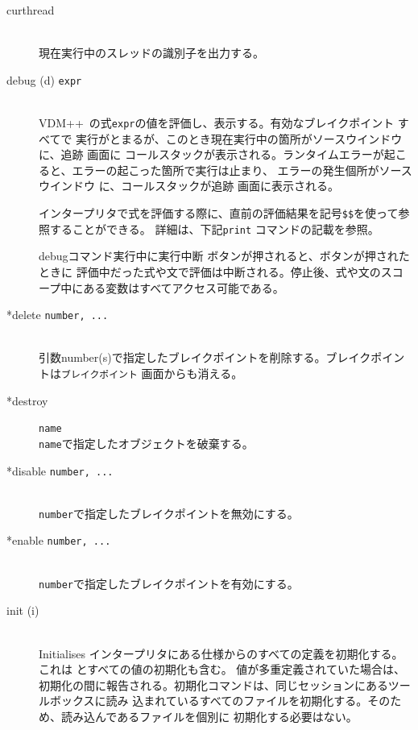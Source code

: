 \documentclass[\pformat,12pt]{jarticle}
\newcommand{\vdmslpp}{VDM++}
\newcommand{\guicmd}[1]{{\gt #1}}
\begin{document}
\begin{description}
\item[curthread]\mbox{}\\
  現在実行中のスレッドの識別子を出力する。

\item[debug (d) {\tt expr}]\mbox{}\\
  \vdmslpp\ の式{\tt expr}の値を評価し、表示する。有効なブレイクポイント すべてで
  実行がとまるが、このとき現在実行中の箇所が\guicmd{ソースウインドウ} に、\guicmd{追跡} 画面に
  コールスタックが表示される。ランタイムエラーが起こると、エラーの起こった箇所で実行は止まり、
  エラーの発生個所が\guicmd{ソースウインドウ} に、コールスタックが\guicmd{追跡} 画面に表示される。
  
  インタープリタで式を評価する際に、直前の評価結果を記号{\tt \$\$}\index{\$\$}を使って参照することができる。
  詳細は、下記{\tt print} コマンドの記載を参照。
  
  debugコマンド実行中に\guicmd{実行中断} ボタンが押されると、ボタンが押されたときに
  評価中だった式や文で評価は中断される。停止後、式や文のスコープ中にある変数はすべてアクセス可能である。
  
\item[*delete {\tt number, ...}] 
\mbox{}\\
  引数number(s)で指定したブレイクポイントを削除する。ブレイクポイントは\texttt{ブレイクポイント} 画面からも消える。
  
\item[*destroy] {\tt name}\mbox{}\\
  {\tt name}で指定したオブジェクトを破棄する。

\item[*disable \texttt{number, ...}]
\mbox{}\\
  \texttt{number}で指定したブレイクポイントを無効にする。

\item[*enable \texttt{number, ...}]
\mbox{}\\
  \texttt{number}で指定したブレイクポイントを有効にする。
 
\item[init (i)] \mbox{}\\ Initialises
  インタープリタにある仕様からのすべての定義を初期化する。%
  これは%
   とすべての値の初期化も含む。%
  値が多重定義されていた場合は、%
  初期化の間に報告される。初期化コマンドは、同じセッションにあるツールボックスに読み%
  込まれているすべてのファイルを初期化する。そのため、読み込んであるファイルを個別に%
  初期化する必要はない。
  


\end{description}
\end{document}
